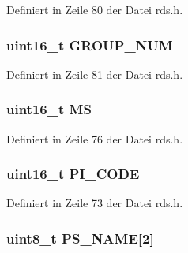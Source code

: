 Definiert in Zeile 80 der Datei rds.\+h.

\hypertarget{structgroup__0b_a9f692e9f76ee88348d426bcd4e9bc70b}{}
\subsubsection[{G\+R\+O\+U\+P\+\_\+\+N\+U\+M}]{\setlength{\rightskip}{0pt plus 5cm}uint16\+\_\+t G\+R\+O\+U\+P\+\_\+\+N\+U\+M}\label{structgroup__0b_a9f692e9f76ee88348d426bcd4e9bc70b}


Definiert in Zeile 81 der Datei rds.\+h.

\hypertarget{structgroup__0b_a0d87191040df43fdd9f67487d0cc1a45}{}
\subsubsection[{M\+S}]{\setlength{\rightskip}{0pt plus 5cm}uint16\+\_\+t M\+S}\label{structgroup__0b_a0d87191040df43fdd9f67487d0cc1a45}


Definiert in Zeile 76 der Datei rds.\+h.

\hypertarget{structgroup__0b_a5cd9b1f6413028425796c1129aa8fd87}{}
\subsubsection[{P\+I\+\_\+\+C\+O\+D\+E}]{\setlength{\rightskip}{0pt plus 5cm}uint16\+\_\+t P\+I\+\_\+\+C\+O\+D\+E}\label{structgroup__0b_a5cd9b1f6413028425796c1129aa8fd87}


Definiert in Zeile 73 der Datei rds.\+h.

\hypertarget{structgroup__0b_a80447425671c19133df16d620705bb09}{}
\subsubsection[{P\+S\+\_\+\+N\+A\+M\+E}]{\setlength{\rightskip}{0pt plus 5cm}uint8\+\_\+t P\+S\+\_\+\+N\+A\+M\+E\mbox{[}2\mbox{]}}\label{structgroup__0b_a80447425671c19133df16d620705bb09}



